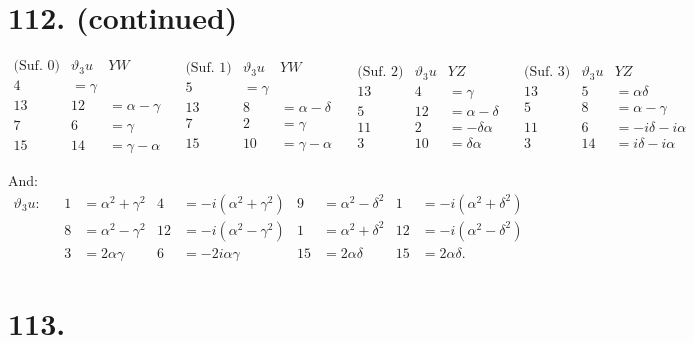\documentclass[11pt,a4paper]{article}
\newcommand{\uth}[1]{\vartheta_{#1}}
\begin{document}
\newpage
\section*{112. (continued)}
\label{sec:112cont}

\[
\begin{array}{c|cc}
\text{(Suf.~0)} & \uth{3}u & YW \\
\hline
4 & = \gamma \\
13 & 12 & = \alpha - \gamma \\
7 & 6 & = \gamma \\
15 & 14 & = \gamma - \alpha
\end{array}
\quad
\begin{array}{c|cc}
\text{(Suf.~1)} & \uth{3}u & YW \\
\hline
5 & = \gamma \\
13 & 8 & = \alpha - \delta \\
7 & 2 & = \gamma \\
15 & 10 & = \gamma - \alpha
\end{array}
\quad
\begin{array}{c|cc}
\text{(Suf.~2)} & \uth{3}u & YZ \\
\hline
13 & 4 & = \gamma \\
5 & 12 & = \alpha - \delta \\
11 & 2 & = -\delta\alpha \\
3 & 10 & = \delta\alpha
\end{array}
\quad
\begin{array}{c|cc}
\text{(Suf.~3)} & \uth{3}u & YZ \\
\hline
13 & 5 & = \alpha\delta \\
5 & 8 & = \alpha - \gamma \\
11 & 6 & = -i\delta - i\alpha \\
3 & 14 & = i\delta - i\alpha
\end{array}
\]

And:
\begin{align*}
\uth{3}u: && 1 &= \alpha^2 + \gamma^2 & 4 &= -i(\alpha^2 + \gamma^2) & 9 &= \alpha^2 - \delta^2 & 1 &= -i(\alpha^2 + \delta^2) \\
&& 8 &= \alpha^2 - \gamma^2 & 12 &= -i(\alpha^2 - \gamma^2) & 1 &= \alpha^2 + \delta^2 & 12 &= -i(\alpha^2 - \delta^2) \\
&& 3 &= 2\alpha\gamma & 6 &= -2i\alpha\gamma & 15 &= 2\alpha\delta & 15 &= 2\alpha\delta.
\end{align*}

\newpage
\section*{113.}
\label{sec:113}
\end{document}
